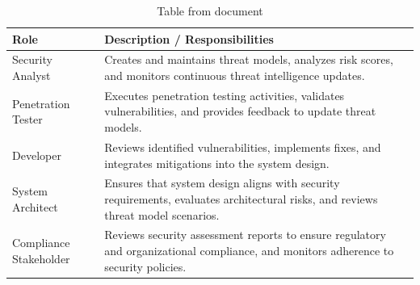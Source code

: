 \documentclass[12pt,a4paper]{report}
\begin{document}
\begin{table}[H]
\centering
\small
\begin{tabularx}{\textwidth}{|l|l|}
\hline
Role & Description / Responsibilities \\
\hline\hline
Security Analyst & Creates and maintains threat models, analyzes risk scores, and monitors continuous threat intelligence updates. \\
\hline
Penetration Tester & Executes penetration testing activities, validates vulnerabilities, and provides feedback to update threat models. \\
\hline
Developer & Reviews identified vulnerabilities, implements fixes, and integrates mitigations into the system design. \\
\hline
System Architect & Ensures that system design aligns with security requirements, evaluates architectural risks, and reviews threat model scenarios. \\
\hline
Compliance Stakeholder & Reviews security assessment reports to ensure regulatory and organizational compliance, and monitors adherence to security policies. \\
\hline
\end{tabularx}
\caption{Table from document}
\end{table}
\end{document}
